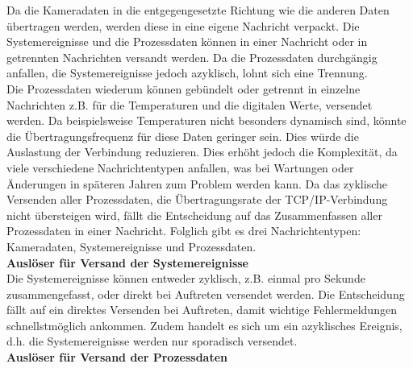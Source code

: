 \documentclass[ a4paper,
                oneside,
                toc=bibliography,
                toc=listof
                ]{scrbook}
\begin{document}
	Da die Kameradaten in die entgegengesetzte Richtung wie die anderen Daten übertragen werden, werden diese in eine eigene Nachricht verpackt. Die Systemereignisse und die Prozessdaten können in einer Nachricht oder in getrennten Nachrichten versandt werden. Da die Prozessdaten durchgängig anfallen, die Systemereignisse jedoch azyklisch, lohnt sich eine Trennung.\\
	Die Prozessdaten wiederum können gebündelt oder getrennt in einzelne Nachrichten z.B. für die Temperaturen und die digitalen Werte, versendet werden. Da beispielsweise Temperaturen nicht besonders dynamisch sind, könnte die Übertragungsfrequenz für diese Daten geringer sein. Dies würde die Auslastung der Verbindung reduzieren. Dies erhöht jedoch die Komplexität, da viele verschiedene Nachrichtentypen anfallen, was bei Wartungen oder Änderungen in späteren Jahren zum Problem werden kann. Da das zyklische Versenden aller Prozessdaten, die Übertragungsrate der TCP/IP-Verbindung nicht übersteigen wird, fällt die Entscheidung auf das Zusammenfassen aller Prozessdaten in einer Nachricht. Folglich gibt es drei Nachrichtentypen: Kameradaten, Systemereignisse und Prozessdaten.\vspace{0.5\baselineskip}\\
	\textbf{Auslöser für Versand der Systemereignisse}\\
	Die Systemereignisse können entweder zyklisch, z.B. einmal pro Sekunde zusammengefasst, oder direkt bei Auftreten versendet werden. Die Entscheidung fällt auf ein direktes Versenden bei Auftreten, damit wichtige Fehlermeldungen schnellstmöglich ankommen. Zudem handelt es sich um ein azyklisches Ereignis, d.h. die Systemereignisse werden nur sporadisch versendet.\vspace{0.5\baselineskip}\\
	\textbf{Auslöser für Versand der Prozessdaten}\\
\end{document}
